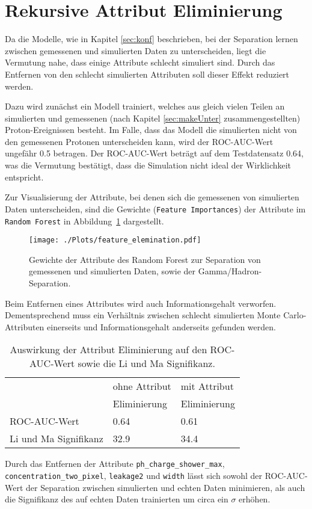 \section{Rekursive Attribut Eliminierung}
Da die Modelle, wie in Kapitel \ref{sec:konf} beschrieben, bei der Separation lernen zwischen gemessenen und simulierten Daten zu unterscheiden, liegt die Vermutung nahe, dass einige Attribute schlecht simuliert sind.
Durch das Entfernen von den schlecht simulierten Attributen soll dieser Effekt reduziert werden.

Dazu wird zunächst ein Modell trainiert, welches aus gleich vielen Teilen an simulierten und gemessenen (nach Kapitel \ref{sec:makeUnter} zusammengestellten) Proton-Ereignissen besteht. 
Im Falle, dass das Modell die simulierten nicht von den gemessenen Protonen unterscheiden kann, wird der ROC-AUC-Wert ungefähr \num{0.5} betragen. 
Der ROC-AUC-Wert beträgt auf dem Testdatensatz \num{0.64}, was die Vermutung bestätigt, dass die Simulation nicht ideal der Wirklichkeit entspricht. 

Zur Visualisierung der Attribute, bei denen sich die gemessenen von simulierten Daten unterscheiden, sind die Gewichte (\texttt{Feature Importances}) der Attribute im \texttt{Random Forest} in Abbildung~\ref{fig:featureimportance} dargestellt. 
\begin{figure}[H]
  \centering
  \texttt{[image: ./Plots/feature\_elemination.pdf]}
  \caption{Gewichte der Attribute des Random Forest zur Separation von gemessenen und simulierten Daten, sowie der Gamma/Hadron-Separation.}
  \label{fig:featureimportance}
\end{figure}
Beim Entfernen eines Attributes wird auch Informationsgehalt verworfen. 
Dementsprechend muss ein Verhältnis zwischen schlecht simulierten Monte Carlo-Attributen einerseits und Informationsgehalt anderseits gefunden werden.
\begin{table}
  \centering
  \caption{Auswirkung der Attribut Eliminierung auf den ROC-AUC-Wert sowie die Li und Ma Signifikanz.}
  \begin{tabular}{l s s}
	\toprule
								& ohne Attribut & mit Attribut \\
								& Eliminierung 	& Eliminierung \\
	  	\cmidrule(r){2-3} 
	  	ROC-AUC-Wert 			& \num{0.64} & \num{0.61} \\
		Li und Ma Signifikanz 	& \SI{32.9}{\sigma} & \SI{34.4}{\sigma} \\
	\bottomrule
  \end{tabular}
  \label{tab:<+label+>}
\end{table}
Durch das Entfernen der Attribute \texttt{ph\_charge\_shower\_max}, \texttt{concentration\_two\_pixel}, \texttt{leakage2} und \texttt{width} lässt sich sowohl der ROC-AUC-Wert der Separation zwischen simulierten und echten Daten minimieren, als auch die Signifikanz des auf echten Daten trainierten  um circa ein $\sigma$ erhöhen.
